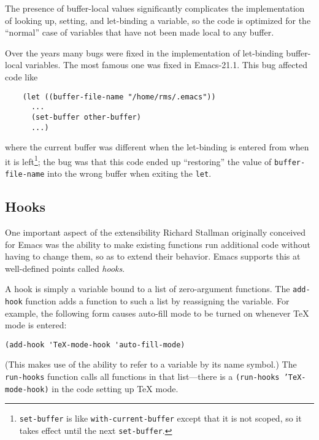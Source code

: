 \documentclass[format=acmsmall, review]{acmart}
\begin{document}
The presence of buffer-local values significantly complicates the
implementation of looking up, setting, and let-binding a variable, so the
code is optimized for the ``normal'' case of variables that have not been
made local to any buffer.

Over the years many bugs were fixed in the implementation of let-binding
buffer-local variables.  The most famous one was fixed in Emacs-21.1.
This bug affected code like
\begin{verbatim}
    (let ((buffer-file-name "/home/rms/.emacs"))
      ...
      (set-buffer other-buffer)
      ...)
\end{verbatim}
where the current buffer was different when the let-binding is entered from
when it is left\footnote{\texttt{set-buffer} is like
  \texttt{with-current-buffer} except that it is not scoped, so it takes
  effect until the next \texttt{set-buffer}.}; the bug was that this code
ended up ``restoring'' the value of \texttt{buffer-file-name} into the
wrong buffer when exiting the \texttt{let}.

\subsection{Hooks}
\label{sec:hooks}

One important aspect of the extensibility Richard Stallman originally
conceived for Emacs was the ability to make existing functions run
additional code without having to change them, so as to extend their
behavior.  Emacs supports this at well-defined points called
\emph{hooks}.

A hook is simply a variable bound to a list of zero-argument
functions.  The \texttt{add-hook} function adds a function to such a
list by reassigning the variable.  For example, the following form
causes auto-fill mode to be turned on whenever \TeX{} mode is entered:
%
\begin{verbatim}
(add-hook 'TeX-mode-hook 'auto-fill-mode)
\end{verbatim}

(This makes use of the ability to refer to a variable by its name
symbol.)  The \texttt{run-hooks} function calls all functions in that
list---there is a \texttt{(run-hooks 'TeX-mode-hook)} in the code
setting up \TeX{} mode.
\end{document}
